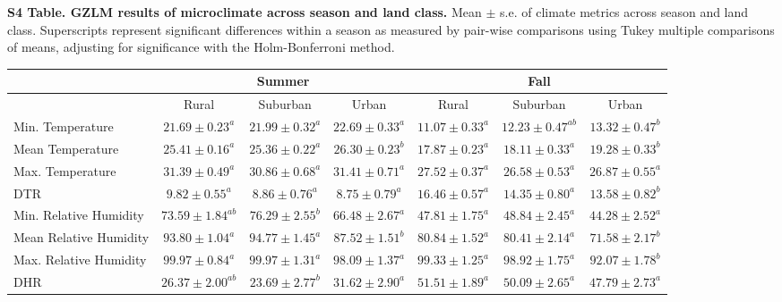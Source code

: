 \documentclass[12pt]{article}
\begin{document}
\begin{landscape}

\begin{table}[]
\centering
\textbf{S4 Table. GZLM results of microclimate across season and land class.} Mean $\pm$ s.e. of climate metrics across season and land class. Superscripts represent significant differences within a season as measured by pair-wise comparisons using Tukey multiple comparisons of means, adjusting for significance with the Holm-Bonferroni method.
\begin{tabular}{l|ccc|ccc}
	                       & \multicolumn{3}{c}{Summer}                            & \multicolumn{3}{c}{Fall}                              \\
	\hline
	                       & Rural            & Suburban        & Urban            & Rural            & Suburban         & Urban           \\
	\hline
	Min. Temperature       & $21.69 \pm 0.23^a$  & $21.99 \pm 0.32^a$ & $22.69 \pm 0.33^a$  & $11.07 \pm 0.33^a$  & $12.23 \pm 0.47^{ab}$ & $13.32 \pm 0.47^b$ \\
	Mean Temperature       & $25.41 \pm 0.16^a$  & $25.36 \pm 0.22^a$ & $26.30 \pm 0.23^b$  & $17.87 \pm 0.23^a$  & $18.11 \pm 0.33^a$  & $19.28 \pm 0.33^b$ \\
	Max. Temperature       & $31.39 \pm 0.49^a$  & $30.86 \pm 0.68^a$ & $31.41 \pm 0.71^a$  & $27.52 \pm 0.37^a$  & $26.58 \pm 0.53^a$  & $26.87 \pm 0.55^a$ \\
	DTR                    & $9.82 \pm 0.55^a$   & $8.86 \pm 0.76^a$  & $8.75 \pm 0.79^a$   & $16.46 \pm 0.57^a$  & $14.35 \pm 0.80^a$  & $13.58 \pm 0.82^b$ \\
	Min. Relative Humidity & $73.59 \pm 1.84^{ab}$ & $76.29 \pm 2.55^b$ & $66.48 \pm 2.67^a$  & $47.81 \pm 1.75^a$  & $48.84 \pm 2.45^a$  & $44.28 \pm 2.52^a$ \\
	Mean Relative Humidity & $93.80 \pm 1.04^a$ & $94.77 \pm 1.45^a$ & $87.52 \pm 1.51^b$ & $80.84  \pm 1.52^a$ & $80.41 \pm 2.14^a$  & $71.58 \pm 2.17^b$ \\
	Max. Relative Humidity & $99.97 \pm 0.84^a$  & $99.97 \pm 1.31^a$ & $98.09 \pm 1.37^a$  & $99.33 \pm 1.25^a$  & $98.92 \pm 1.75^a$  & $92.07 \pm 1.78^b$ \\
	DHR                    & $26.37 \pm 2.00^{ab}$ & $23.69 \pm 2.77^b$ & $31.62 \pm 2.90^a$  & $51.51 \pm 1.89^a$  & $50.09 \pm 2.65^a$  & $47.79 \pm 2.73^a$
\end{tabular}
\end{table}

\end{landscape}
\end{document}
